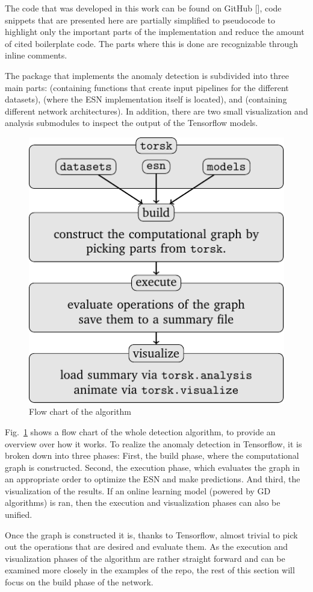 The code that was developed in this work can be found on GitHub
[\cite{coderepo}], code snippets that are presented here are partially simplified
to pseudocode to highlight only the important parts of the implementation and
reduce the amount of cited boilerplate code. The parts where this is done are
recognizable through inline comments.

The package that implements the anomaly detection is subdivided into three main
parts:  (containing functions that create input pipelines
for the different datasets),  (where the ESN implementation
itself is located), and  (containing different network
architectures). In addition, there are two small visualization and analysis
submodules to inspect the output of the Tensorflow models.

\begin{figure}
  \centering
  \includegraphics[width=0.5\linewidth]{tikz/flow.pdf}
  \caption{Flow chart of the algorithm}
  \label{fig:flowchart}
\end{figure}

Fig.~\ref{fig:flowchart} shows a flow chart of the whole detection algorithm,
to provide an overview over how it works.  To realize the anomaly detection in
Tensorflow, it is broken down into three phases: First, the build phase, where
the computational graph is constructed. Second, the execution phase, which
evaluates the graph in an appropriate order to optimize the ESN and make
predictions. And third, the visualization of the results.  If an online
learning model (powered by GD algorithms) is ran, then the execution and
visualization phases can also be unified.

Once the graph is constructed it is, thanks to Tensorflow, almost trivial to
pick out the operations that are desired and evaluate them. As the execution
and visualization phases of the algorithm are rather straight forward and can
be examined more closely in the examples of the  repo, the rest of
this section will focus on the build phase of the network. 


